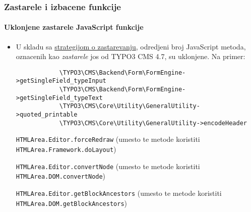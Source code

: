 \begin{frame}[fragile]
	\frametitle{Zastarele i izbacene funkcije}
	\framesubtitle{Uklonjene zastarele JavaScript funkcije}

	\begin{itemize}
		\item U skladu sa \href{http://forge.typo3.org/projects/typo3v4-core/wiki/CoreDevPolicy}{strategijom o zastarevanju},
			odredjeni broj JavaScript metoda, oznacenih kao \textit{zastarele} jos od TYPO3 CMS 4.7, su uklonjene. Na primer:

		\begin{lstlisting}
			\TYPO3\CMS\Backend\Form\FormEngine->getSingleField_typeInput
			\TYPO3\CMS\Backend\Form\FormEngine->getSingleField_typeText
			\TYPO3\CMS\Core\Utility\GeneralUtility->quoted_printable
			\TYPO3\CMS\Core\Utility\GeneralUtility->encodeHeader
		\end{lstlisting}

		\smaller
			\texttt{HTMLArea.Editor.forceRedraw}\newline
				(umesto te metode koristiti \texttt{HTMLArea.Framework.doLayout})
				\vspace{0.2cm}

			\texttt{HTMLArea.Editor.convertNode}\newline
				(umesto te metode koristiti \texttt{HTMLArea.DOM.convertNode})
				\vspace{0.2cm}

			\texttt{HTMLArea.Editor.getBlockAncestors}\newline
				(umesto te metode koristiti \texttt{HTMLArea.DOM.getBlockAncestors})
		\normalsize

	\end{itemize}

\end{frame}


